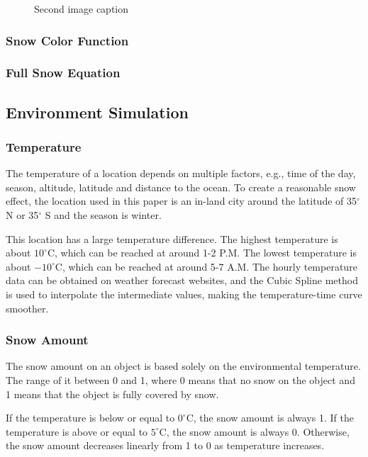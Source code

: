 \documentclass{article}
\begin{document}
\begin{figure}[h]
\begin{minipage}{0.45\textwidth}
      \caption{Second image caption}
      \label{fig:image2}
  \end{minipage}
\end{figure}


\subsubsection {Snow Color Function}

\subsubsection {Full Snow Equation}

\subsection {Environment Simulation}

\subsubsection {Temperature}
The temperature of a location depends on multiple factors, e.g., time of the day, season, altitude, 
latitude and distance to the ocean. To create a reasonable snow effect, the location used in this paper 
is an in-land city around the latitude of 35$^{\circ}$ N or 35$^{\circ}$ S and the season is winter.

This location has a large temperature difference. The highest temperature is about 
\(10^\circ\mathrm{C}\), which can be reached at around 1-2 P.M. The lowest temperature is about 
\(-10^\circ\mathrm{C}\), which can be reached at around 5-7 A.M. The hourly temperature data can be
obtained on weather forecast websites, and the Cubic Spline method is used to interpolate the 
intermediate values, making the temperature-time curve smoother.

\subsubsection {Snow Amount}
The snow amount on an object is based solely on the environmental temperature. 
The range of it between 0 and 1, where 0 means that no snow on the object and 1 means
that the object is fully covered by snow.

If the temperature is below or equal to \(0^\circ\mathrm{C}\), the snow amount is always 1. 
If the temperature is above or equal to \(5^\circ\mathrm{C}\), the snow amount is always 0. 
Otherwise, the snow amount decreases linearly from 1 to 0 as temperature increases.
\end{document}
